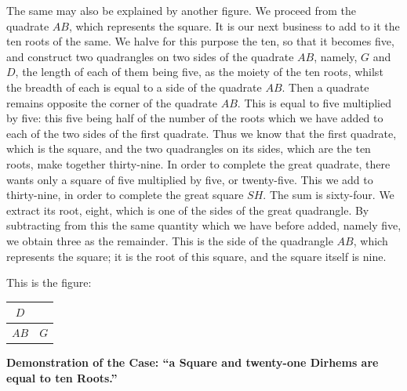 The same may also be explained by another figure. We proceed from the quadrate $AB$, which represents the square. It is our next business to add to it the ten roots of the same. We halve for this purpose the ten, so that it becomes five, and construct two quadrangles on two sides of the quadrate $AB$, namely, $G$ and $D$, the length of each of them being five, as the moiety of the ten roots, whilst the breadth of each is equal to a side of the quadrate $AB$. Then a quadrate remains opposite the corner of the quadrate $AB$. This is equal to five multiplied by five: this five being half of the number of the roots which we have added to each of the two sides of the first quadrate. Thus we know that the first quadrate, which is the square, and the two quadrangles on its sides, which are the ten roots, make together thirty-nine. In order to complete the great quadrate, there wants only a square of five multiplied by five, or twenty-five. This we add to thirty-nine, in order to complete the great square $SH$. The sum is sixty-four. We extract its root, eight, which is one of the sides of the great quadrangle. By subtracting from this the same quantity which we have before added, namely five, we obtain three as the remainder. This is the side of the quadrangle $AB$, which represents the square; it is the root of this square, and the square itself is nine.

This is the figure:
\begin{center}
\begin{tabular}{c|c}
\hline
$D$ & \\
\hline
$AB$ & $G$ \\
\hline
\end{tabular}
\end{center}

\vspace{0.5cm}
\noindent\textbf{Demonstration of the Case: ``a Square and twenty-one Dirhems are equal to ten Roots.''}

